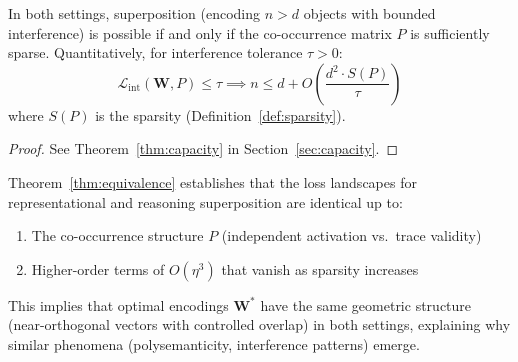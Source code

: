 \begin{corollary}
\label{cor:sparsity}
In both settings, superposition (encoding $n > d$ objects with bounded interference) is possible if and only if the co-occurrence matrix $P$ is sufficiently sparse. Quantitatively, for interference tolerance $\tau > 0$:
\begin{equation}
\mathcal{L}_{\text{int}}(\mathbf{W}, P) \leq \tau \implies n \leq d + O\left(\frac{d^2 \cdot S(P)}{\tau}\right)
\end{equation}
where $S(P)$ is the sparsity (Definition~\ref{def:sparsity}).
\end{corollary}

\begin{proof}
See Theorem~\ref{thm:capacity} in Section~\ref{sec:capacity}.
\end{proof}

\begin{remark}
\label{rem:interpretation}
Theorem~\ref{thm:equivalence} establishes that the loss landscapes for representational and reasoning superposition are identical up to:
\begin{enumerate}
    \item The co-occurrence structure $P$ (independent activation vs.\ trace validity)
    \item Higher-order terms of $O(\eta^3)$ that vanish as sparsity increases
\end{enumerate}
This implies that optimal encodings $\mathbf{W}^*$ have the same geometric structure (near-orthogonal vectors with controlled overlap) in both settings, explaining why similar phenomena (polysemanticity, interference patterns) emerge.
\end{remark}
